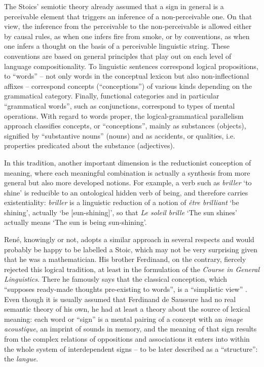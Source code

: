 \documentclass[output=paper]{langsci/langscibook}
\begin{document}
The Stoics' semiotic theory already assumed that a sign in general is
a perceivable element that triggers an inference of a non-perceivable
one. On that view, the inference from the perceivable to the
non-perceivable is allowed either by causal rules, as when one infers
fire from smoke, or by conventions, as when one infers a thought on
the basis of a perceivable linguistic string. These conventions are
based on general principles that play out on each level of language
compositionality. To linguistic sentences correspond logical
propositions, to ``words'' -- not only words in the conceptual lexicon
but also non-inflectional affixes -- correspond concepts (``conceptions'')
of various kinds depending on the grammatical category. Finally,
functional categories and in particular ``grammatical words'', such as
conjunctions, correspond to types of mental operations.  With regard
to words proper, the logical-grammatical parallelism approach
classifies concepts, or ``conceptions'', mainly as substances (objects),
signified by ``substantive nouns'' (nouns) and as accidents, or
qualities, i.e. properties predicated about the substance
(adjectives).

In this tradition, another important dimension is the reductionist
conception of meaning, where each meaningful combination is actually a
synthesis from more general but also more developed notions. For
example, a verb such as \emph{briller} `to shine' is reducible to an
ontological hidden verb of being, and therefore carries
existentiality: \emph{briller} is a linguistic reduction of a notion
of \emph{être brilliant} `be shining', actually `be [sun-shining]', so
that \emph{Le soleil brille} ‘The sun shines’ actually means ‘The sun
is being sun-shining’.

René, knowingly or not, adopts a similar approach in several respects
and would probably be happy to be labelled a Stoic, which may not be
very surprising given that he was a mathematician. His brother
Ferdinand, on the contrary, fiercely rejected this logical tradition,
at least in the formulation of the \textsl{Course in General
  Linguistics}. There he famously says that the classical conception,
which “supposes ready-made thoughts pre-existing to words”, is a
“simplistic view” \citep[97]{saussure:cours}. Even though it is
usually assumed that Ferdinand de Saussure had no real semantic theory
of his own, he had at least a theory about the source of lexical
meaning: each word or ``sign'' is a mental pairing of a concept with an
\emph{image acoustique}, an imprint of sounds in memory, and the
meaning of that sign results from the complex relations of oppositions
and associations it enters into within the whole system of
interdependent signs -- to be later described as a ``structure'': the
\emph{langue}.\largerpage
\end{document}
